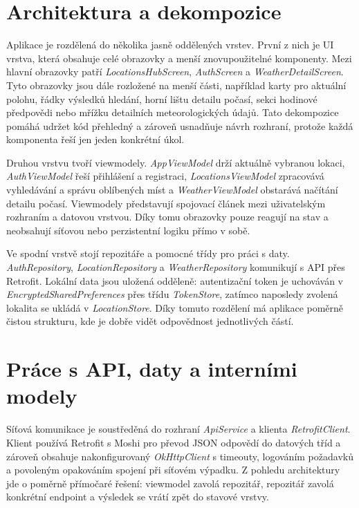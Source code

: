 \documentclass[12pt,a4paper]{article}
\begin{document}
\section{Architektura a dekompozice}
Aplikace je rozdělená do několika jasně oddělených vrstev. První z nich je UI vrstva, která obsahuje celé obrazovky a menší znovupoužitelné komponenty. Mezi hlavní obrazovky patří \textit{LocationsHubScreen}, \textit{AuthScreen} a \textit{WeatherDetailScreen}. Tyto obrazovky jsou dále rozložené na menší části, například karty pro aktuální polohu, řádky výsledků hledání, horní lištu detailu počasí, sekci hodinové předpovědi nebo mřížku detailních meteorologických údajů. Tato dekompozice pomáhá udržet kód přehledný a zároveň usnadňuje návrh rozhraní, protože každá komponenta řeší jen jeden konkrétní úkol.

Druhou vrstvu tvoří viewmodely. \textit{AppViewModel} drží aktuálně vybranou lokaci, \textit{AuthViewModel} řeší přihlášení a registraci, \textit{LocationsViewModel} zpracovává vyhledávání a správu oblíbených míst a \textit{WeatherViewModel} obstarává načítání detailu počasí. Viewmodely představují spojovací článek mezi uživatelským rozhraním a datovou vrstvou. Díky tomu obrazovky pouze reagují na stav a neobsahují síťovou nebo perzistentní logiku přímo v sobě.

Ve spodní vrstvě stojí repozitáře a pomocné třídy pro práci s daty. \textit{AuthRepository}, \textit{LocationRepository} a \textit{WeatherRepository} komunikují s API přes Retrofit. Lokální data jsou uložená odděleně: autentizační token je uchováván v \textit{EncryptedSharedPreferences} přes třídu \textit{TokenStore}, zatímco naposledy zvolená lokalita se ukládá v \textit{LocationStore}. Díky tomuto rozdělení má aplikace poměrně čistou strukturu, kde je dobře vidět odpovědnost jednotlivých částí.

\section{Práce s API, daty a interními modely}
Síťová komunikace je soustředěná do rozhraní \textit{ApiService} a klienta \textit{RetrofitClient}. Klient používá Retrofit s Moshi pro převod JSON odpovědí do datových tříd a zároveň obsahuje nakonfigurovaný \textit{OkHttpClient} s timeouty, logováním požadavků a povoleným opakováním spojení při síťovém výpadku. Z pohledu architektury jde o poměrně přímočaré řešení: viewmodel zavolá repozitář, repozitář zavolá konkrétní endpoint a výsledek se vrátí zpět do stavové vrstvy.
\end{document}

